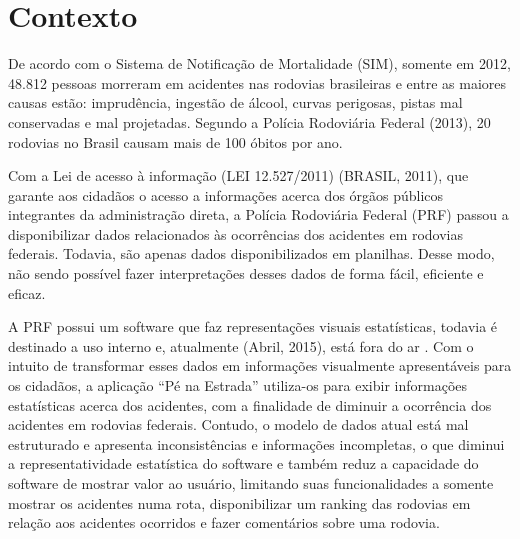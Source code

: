 \section[Contexto]{Contexto}

De acordo com o Sistema de Notificação de Mortalidade (SIM), somente em 2012,
48.812 pessoas morreram em acidentes nas rodovias brasileiras e entre as maiores causas
estão: imprudência, ingestão de álcool, curvas perigosas, pistas mal conservadas e mal
projetadas. Segundo a Polícia Rodoviária Federal (2013), 20 rodovias no Brasil causam
mais de 100 óbitos por ano.

Com a Lei de acesso à informação (LEI 12.527/2011) (BRASIL, 2011), que garante
aos cidadãos o acesso a informações acerca dos órgãos públicos integrantes da
administração direta, a Polícia Rodoviária Federal (PRF) passou a disponibilizar dados
relacionados às ocorrências dos acidentes em rodovias federais. Todavia, são apenas
dados disponibilizados em planilhas. Desse modo, não sendo possível fazer interpretações
desses dados de forma fácil, eficiente e eficaz.

A PRF possui um software que faz representações visuais estatísticas, todavia é
destinado a uso interno e, atualmente (Abril, 2015), está fora do ar . Com o intuito de
transformar esses dados em informações visualmente apresentáveis para os cidadãos, a
aplicação “Pé na Estrada” utiliza-os para exibir informações estatísticas acerca dos
acidentes, com a finalidade de diminuir a ocorrência dos acidentes em rodovias federais.
Contudo, o modelo de dados atual está mal estruturado e apresenta inconsistências e
informações incompletas, o que diminui a representatividade estatística do software e
também reduz a capacidade do software de mostrar valor ao usuário, limitando suas
funcionalidades a somente mostrar os acidentes numa rota, disponibilizar um ranking das
rodovias em relação aos acidentes ocorridos e fazer comentários sobre uma rodovia.